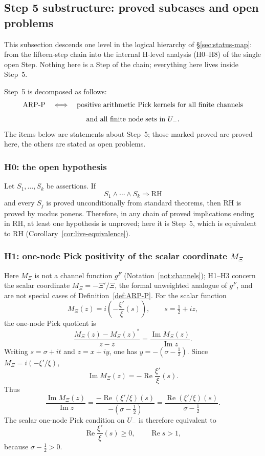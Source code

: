 \documentclass[11pt]{amsart}
\theoremstyle{definition}
\theoremstyle{remark}
\theoremstyle{definition}
\renewcommand{\Re}{\operatorname{Re}}
\renewcommand{\Im}{\operatorname{Im}}
\newcommand{\half}{\tfrac{1}{2}}
\begin{document}
\subsection{Step 5 substructure: proved subcases and open problems}

This subsection descends one level in the logical hierarchy of \S\ref{sec:status-map}: from the
fifteen-step chain into the internal H-level analysis (H0--H8) of the single open Step.  Nothing here is
a Step of the chain; everything here lives inside Step~5.

Step~5 is decomposed as follows:
\[
   \textnormal{ARP-P}
   \quad\Longleftrightarrow\quad
   \textnormal{positive arithmetic Pick kernels for all finite channels}
\]
\[
   \textnormal{and all finite node sets in }U_-.
\]
The items below are statements about Step~5; those marked proved are proved here, the others are
stated as open problems.

\subsubsection*{H0: the open hypothesis}

Let $S_1,\ldots,S_k$ be assertions.  If
\[
   S_1\wedge\cdots\wedge S_k\Longrightarrow\mathrm{RH}
\]
and every $S_j$ is proved unconditionally from standard theorems, then RH is proved by modus ponens.
Therefore, in any chain of proved implications ending in RH, at least one hypothesis is unproved; here
it is Step~5, which is equivalent to RH (Corollary~\ref{cor:live-equivalence}).

\subsubsection*{H1: one-node Pick positivity of the scalar coordinate $M_\Xi$}

Here $M_\Xi$ is not a channel function $g^F$ (Notation~\ref{not:channels}); H1--H3 concern the scalar
coordinate $M_\Xi=-\Xi'/\Xi$, the formal unweighted analogue of $g^F$, and are not special cases of
Definition~\ref{def:ARP-P}.  For the scalar function
\[
   M_\Xi(z)=i\left(-\frac{\xi'}{\xi}(s)\right),\qquad s=\half+iz,
\]
the one-node Pick quotient is
\[
   \frac{M_\Xi(z)-M_\Xi(z)^*}{z-\bar z}
   =
   \frac{\Im M_\Xi(z)}{\Im z}.
\]
Writing $s=\sigma+it$ and $z=x+iy$, one has $y=-(\sigma-\half)$.  Since
$M_\Xi=i(-\xi'/\xi)$,
\[
   \Im M_\Xi(z)=-\Re\frac{\xi'}{\xi}(s).
\]
Thus
\[
   \frac{\Im M_\Xi(z)}{\Im z}
   =
   \frac{-\Re(\xi'/\xi)(s)}{-(\sigma-\half)}
   =
   \frac{\Re(\xi'/\xi)(s)}{\sigma-\half}.
\]
The scalar one-node Pick condition on $U_-$ is therefore equivalent to
\[
   \Re\frac{\xi'}{\xi}(s)\ge0,\qquad \Re s>1,
\]
because $\sigma-\half>0$.
\end{document}
